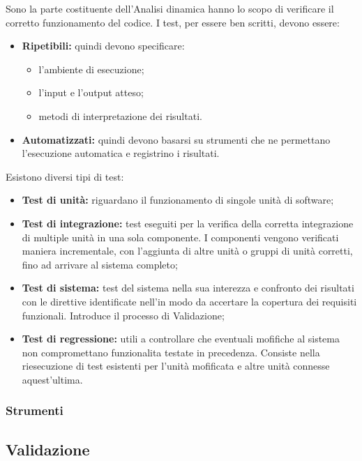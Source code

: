         Sono la parte costituente dell'Analisi dinamica hanno lo scopo di verificare il corretto funzionamento del codice. I test, per essere ben scritti, devono essere:
        \begin{itemize}
          \item \textbf{Ripetibili:} quindi devono specificare:
            \begin{itemize}
              \item l'ambiente di esecuzione;
              \item l'input e l'output atteso;
              \item metodi di interpretazione dei risultati.
            \end{itemize}
          \item \textbf{Automatizzati:} quindi devono basarsi su strumenti che ne permettano l'esecuzione automatica e registrino i risultati.
        \end{itemize}
        Esistono diversi tipi di test:
        \begin{itemize}
          \item \textbf{Test di unità:} riguardano il funzionamento di singole unità di software;
          \item \textbf{Test di integrazione:} test eseguiti per la verifica della corretta integrazione di multiple unità in una sola componente. I componenti vengono verificati maniera incrementale, con l'aggiunta di altre unità o gruppi di unità corretti, fino ad arrivare al sistema completo;
          \item \textbf{Test di sistema:} test del sistema nella sua interezza e confronto dei risultati con le direttive identificate nell'\AdR in modo da accertare la copertura dei requisiti funzionali. Introduce il processo di Validazione;
          \item \textbf{Test di regressione:} utili a controllare che eventuali mofifiche al sistema non compromettano funzionalita testate in precedenza. Consiste nella riesecuzione di test esistenti per l'unità mofificata e altre unità connesse aquest'ultima.
        \end{itemize}

    \subsubsection{Strumenti}

  \subsection{Validazione}
